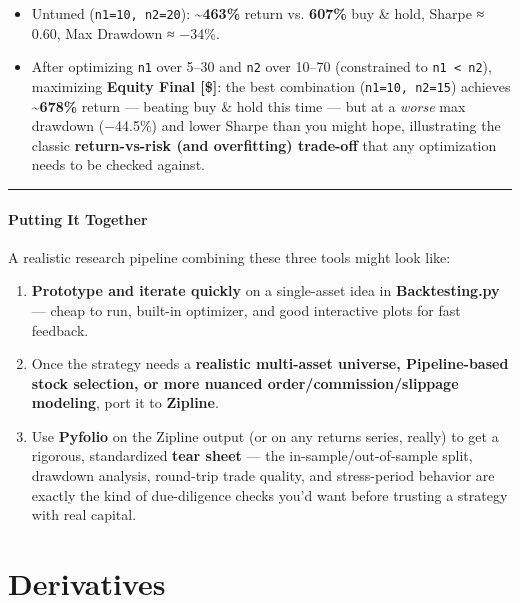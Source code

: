 \documentclass[12pt,openany]{book}
\theoremstyle{definition}
\theoremstyle{remark}
\begin{document}
\begin{itemize}
\item 
Untuned (\texttt{n1=10, n2=20}): \textbf{\textasciitilde{}463\%} return vs. \textbf{607\%} buy \& hold, Sharpe ≈ 0.60, Max Drawdown ≈ −34\%.

\item 
After optimizing \texttt{n1} over 5–30 and \texttt{n2} over 10–70 (constrained to \texttt{n1 < n2}), maximizing \textbf{Equity Final [\$]}: the best combination (\texttt{n1=10, n2=15}) achieves \textbf{\textasciitilde{}678\%} return — beating buy \& hold this time — but at a \emph{worse} max drawdown (−44.5\%) and lower Sharpe than you might hope, illustrating the classic \textbf{return-vs-risk (and overfitting) trade-off} that any optimization needs to be checked against.

\end{itemize}

\medskip
\hrule
\medskip
\subsection{Putting It Together}

A realistic research pipeline combining these three tools might look like:

\begin{enumerate}
\item 
\textbf{Prototype and iterate quickly} on a single-asset idea in \textbf{Backtesting.py} — cheap to run, built-in optimizer, and good interactive plots for fast feedback.

\item 
Once the strategy needs a \textbf{realistic multi-asset universe, Pipeline-based stock selection, or more nuanced order/commission/slippage modeling}, port it to \textbf{Zipline}.

\item 
Use \textbf{Pyfolio} on the Zipline output (or on any returns series, really) to get a rigorous, standardized \textbf{tear sheet} — the in-sample/out-of-sample split, drawdown analysis, round-trip trade quality, and stress-period behavior are exactly the kind of due-diligence checks you'd want before trusting a strategy with real capital.

\end{enumerate}


\part*{Derivatives}
\end{document}

